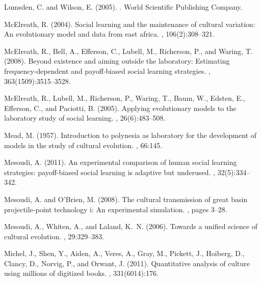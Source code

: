 Lumsden, C. and Wilson, E. (2005).
.
\newblock World Scientific Publishing Company.

McElreath, R. (2004).
\newblock Social learning and the maintenance of cultural variation: An
  evolutionary model and data from east africa.
, 106(2):308--321.

McElreath, R., Bell, A., Efferson, C., Lubell, M., Richerson, P., and Waring,
  T. (2008).
\newblock Beyond existence and aiming outside the laboratory: Estimating
  frequency-dependent and payoff-biased social learning strategies.
, 363(1509):3515--3528.

McElreath, R., Lubell, M., Richerson, P., Waring, T., Baum, W., Edsten, E.,
  Efferson, C., and Paciotti, B. (2005).
\newblock Applying evolutionary models to the laboratory study of social
  learning.
, 26(6):483--508.

Mead, M. (1957).
\newblock Introduction to polynesia as laboratory for the development of models
  in the study of cultural evolution.
, 66:145.

Mesoudi, A. (2011).
\newblock An experimental comparison of human social learning strategies:
  payoff-biased social learning is adaptive but underused.
, 32(5):334--342.

Mesoudi, A. and O'Brien, M. (2008).
\newblock The cultural transmission of great basin projectile-point technology
  i: An experimental simulation.
, pages 3--28.

Mesoudi, A., Whiten, A., and Laland, K.~N. (2006).
\newblock Towards a unified science of cultural evolution.
, 29:329--383.

Michel, J., Shen, Y., Aiden, A., Veres, A., Gray, M., Pickett, J., Hoiberg, D.,
  Clancy, D., Norvig, P., and Orwant, J. (2011).
\newblock Quantitative analysis of culture using millions of digitized books.
, 331(6014):176.

